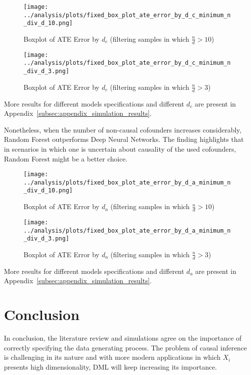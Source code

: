 \documentclass{article}
\numberwithin{equation}{section}
\begin{document}
\begin{figure}[H]
    \centering
    \texttt{[image: ../analysis/plots/fixed\_box\_plot\_ate\_error\_by\_d\_c\_minimum\_n\_div\_d\_10.png]}
    \caption{Boxplot of ATE Error by $d_c$ (filtering samples in which $\frac{n}{d} > 10$)}
\end{figure}

\begin{figure}[H]
    \centering
    \texttt{[image: ../analysis/plots/fixed\_box\_plot\_ate\_error\_by\_d\_c\_minimum\_n\_div\_d\_3.png]}
    \caption{Boxplot of ATE Error by $d_c$ (filtering samples in which $\frac{n}{d} > 3$)}
\end{figure}

More results for different models specifications and different $d_c$ are present in Appendix~\ref{subsec:appendix_simulation_results}.

Nonetheless, when the number of non-causal cofounders increases considerably, Random Forest outperforms Deep Neural Networks. The finding highlights that in scenarios in which one is uncertain about causality of the used cofounders, Random Forest might be a better choice.

\begin{figure}[H]
    \centering
    \texttt{[image: ../analysis/plots/fixed\_box\_plot\_ate\_error\_by\_d\_a\_minimum\_n\_div\_d\_10.png]}
    \caption{Boxplot of ATE Error by $d_a$ (filtering samples in which $\frac{n}{d} > 10$)}
\end{figure}

\begin{figure}[H]
    \centering
    \texttt{[image: ../analysis/plots/fixed\_box\_plot\_ate\_error\_by\_d\_a\_minimum\_n\_div\_d\_3.png]}
    \caption{Boxplot of ATE Error by $d_a$ (filtering samples in which $\frac{n}{d} > 3$)}
\end{figure}

More results for different models specifications and different $d_a$ are present in Appendix~\ref{subsec:appendix_simulation_results}.

\newpage
\section{Conclusion}

In conclusion, the literature review and simulations agree on the importance of correctly specifying the data generating process. The problem of causal inference is challenging in its nature and with more modern applications in which $X_i$ presents high dimensionality, DML will keep increasing its importance.
\end{document}
